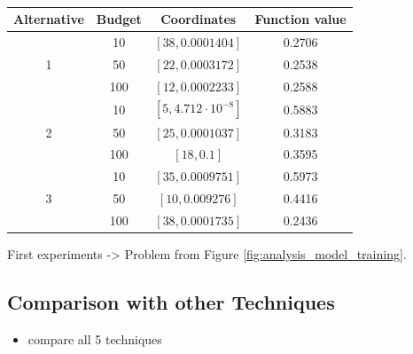\begin{table}[H]
	\caption{  }
	\label{tab:results_alternatives_ml}
	\centering
	\begin{tabular}{| c |  c |c c |} 
		\hline
		Alternative & Budget & Coordinates & Function value \\ 
		\hline
		
		& 10 & $ [38, 0.0001404]$ & 0.2706 \\ 
		1 & 50 & $[22, 0.0003172]$ & 0.2538 \\ 
		& 100 & $[12, 0.0002233]$ & 0.2588 \\ 
		\hline
		& 10 & $ [5, 4.712\cdot 10^{-8}] $ & 0.5883 \\ 
		2 & 50 & $[25, 0.0001037]$ & 0.3183 \\ 
		& 100 & $[18, 0.1]$ & 0.3595 \\ 
		\hline
		& 10 & $ [35, 0.0009751] $ & 0.5973 \\ 
		3 & 50 & $[10, 0.009276]$ & 0.4416 \\ 
		& 100 &$ [38, 0.0001735] $& 0.2436 \\ 
		
		\hline
	\end{tabular}
\end{table}


First experiments -> Problem from Figure \ref{fig:analysis_model_training}.

\subsection{Comparison with other Techniques}

\begin{itemize}
	\item compare all 5 techniques
\end{itemize}








